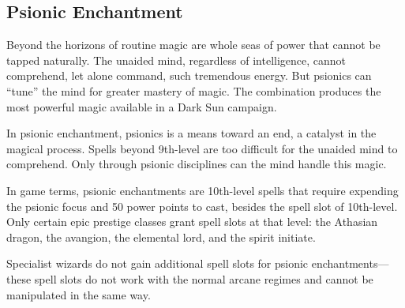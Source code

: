 \subsection{Psionic Enchantment}
Beyond the horizons of routine magic are whole seas of power that cannot be tapped naturally. The unaided mind, regardless of intelligence, cannot comprehend, let alone command, such tremendous energy. But psionics can ``tune'' the mind for greater mastery of magic. The combination produces the most powerful magic available in a {\tableheader Dark Sun} campaign.

In psionic enchantment, psionics is a means toward an end, a catalyst in the magical process. Spells beyond 9th-level are too difficult for the unaided mind to comprehend. Only through psionic disciplines can the mind handle this magic.

In game terms, psionic enchantments are 10th-level spells that require expending the psionic focus and 50 power points to cast, besides the spell slot of 10th-level. Only certain epic prestige classes grant spell slots at that level: the Athasian dragon, the avangion, the elemental lord, and the spirit initiate.

Specialist wizards do not gain additional spell slots for psionic enchantments---these spell slots do not work with the normal arcane regimes and cannot be manipulated in the same way.
